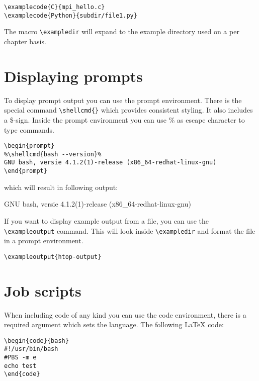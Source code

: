 \documentclass[11pt,a4paper]{article}
\begin{document}
\begin{verbatim}
\examplecode{C}{mpi_hello.c}
\examplecode{Python}{subdir/file1.py}
\end{verbatim}


The macro \verb|\exampledir| will expand to the example directory used on a per
chapter basis.

\section{Displaying prompts}
\label{sec:displaying-prompts}

To display prompt output you can use the prompt environment. There is the
special command \verb|\shellcmd{}| which provides consistent styling. It also
includes a \$-sign. Inside the prompt environment you can use \% as escape
character to type commands.

\begin{verbatim}
\begin{prompt}
%\shellcmd{bash --version}%
GNU bash, versie 4.1.2(1)-release (x86_64-redhat-linux-gnu)
\end{prompt}
\end{verbatim}

which will result in following output:
\begin{prompt}
GNU bash, versie 4.1.2(1)-release (x86_64-redhat-linux-gnu)
\end{prompt}

If you want to display example output from a file, you can use the
\verb|\exampleoutput| command. This will look inside \verb|\exampledir| and
format the file in a prompt environment.

\begin{verbatim}
\exampleoutput{htop-output}
\end{verbatim}

\section{Job scripts}
\label{sec:job-scripts}

When including code of any kind you can use the code environment, there is a
required argument which sets the language. The following LaTeX code:

\begin{verbatim}
\begin{code}{bash}
#!/usr/bin/bash
#PBS -m e
echo test
\end{code}
\end{verbatim}
\end{document}
